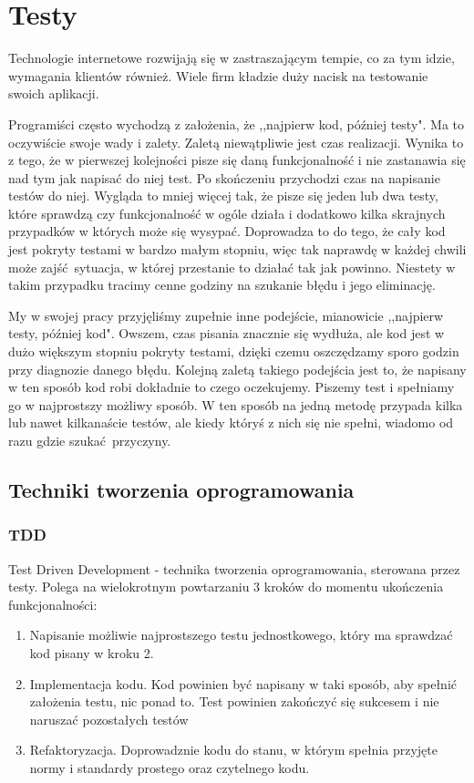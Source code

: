 \section{Testy}
	\label{testy}
    Technologie internetowe rozwijają się w zastraszającym tempie, co za tym idzie, wymagania klientów również. Wiele firm kładzie duży nacisk na testowanie swoich aplikacji.

  	Programiści często wychodzą z założenia, że ,,najpierw kod, później testy". Ma to oczywiście swoje wady i zalety. Zaletą niewątpliwie jest czas realizacji. Wynika to z tego, że w pierwszej kolejności pisze się daną funkcjonalność i nie zastanawia się nad tym jak napisać do niej test. Po skończeniu przychodzi czas na napisanie testów do niej. Wygląda to mniej więcej tak, że pisze się jeden lub dwa testy, które sprawdzą czy funkcjonalność w ogóle działa i dodatkowo kilka skrajnych przypadków w których może się wysypać. Doprowadza to do tego, że cały kod jest pokryty testami w bardzo małym stopniu, więc tak naprawdę w każdej chwili może zajść sytuacja, w której przestanie to działać tak jak powinno. Niestety w takim przypadku tracimy cenne godziny na szukanie błędu i jego eliminację.

  	My w swojej pracy przyjęliśmy zupełnie inne podejście, mianowicie ,,najpierw testy, później kod". Owszem, czas pisania znacznie się wydłuża, ale kod jest w dużo większym stopniu pokryty testami, dzięki czemu oszczędzamy sporo godzin przy diagnozie danego błędu. Kolejną zaletą takiego podejścia jest to, że napisany w ten sposób kod robi dokładnie to czego oczekujemy. Piszemy test i spełniamy go w najprostszy możliwy sposób. W ten sposób na jedną metodę przypada kilka lub nawet kilkanaście testów, ale kiedy któryś z nich się nie spełni, wiadomo od razu gdzie szukać przyczyny.

  \newpage

  \subsection{Techniki tworzenia oprogramowania}
    \subsubsection{TDD}
    Test Driven Development\cite{tdd} - technika tworzenia oprogramowania, sterowana przez testy. Polega na wielokrotnym powtarzaniu 3 kroków do momentu ukończenia funkcjonalności:
    \begin{enumerate}
      \item Napisanie możliwie najprostszego testu jednostkowego, który ma sprawdzać kod pisany w kroku 2.
      \item Implementacja kodu. Kod powinien być napisany w taki sposób, aby spełnić założenia testu, nic ponad to. Test powinien zakończyć się sukcesem i nie naruszać pozostałych testów
      \item Refaktoryzacja. Doprowadznie kodu do stanu, w którym spełnia przyjęte normy i standardy prostego oraz czytelnego kodu\cite{scs}.
    \end{enumerate}


